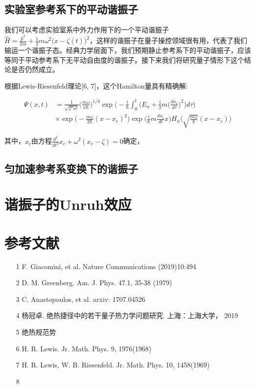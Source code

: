 \documentclass[a4paper]{article}
\begin{document}
    \subsection{实验室参考系下的平动谐振子}
        我们可以考虑实验室系中外力作用下的一个平动谐振子$\hat{H}=\frac{\hat{p}^2}{2m}+\frac{1}{2}m\omega^2\big(\hat{x}-\zeta(t)\big)^2$，这样的谐振子在量子操控领域很有用，代表了我们输运一个谐振子态。经典力学层面下，我们预期静止参考系下的平动谐振子，应该等同于平动参考系下无平动自由度的谐振子。接下来我们将研究量子情形下这个结论是否仍然成立。

        根据Lewis-Riesenfeld理论[6, 7]，这个Hamilton量具有精确解:

        \begin{equation}
            \begin{split}  
                \Psi(x,t)& =\frac{1}{\sqrt{2^n n!}}\bigg(\frac{m\omega}{\pi\hbar}\bigg)^{1/4} \exp\bigg(-\frac{i}{\hbar}\int_0^t \bigg(E_n+\frac{1}{2}m\big(\frac{dx_c}{d\tau}\big)^2\bigg)d\tau\bigg) \\
                    & \times\exp\bigg(-\frac{m\omega}{2\hbar}(x-x_c)^2\bigg) \exp\bigg(\frac{i}{\hbar}m\frac{dx_c}{dt}x\bigg) H_n\bigg(\sqrt{\frac{m\omega}{\hbar}}(x-x_c)\bigg)
            \end{split}
        \end{equation}
    
        其中，$x_c$由方程$\frac{d^2}{dt^2}x_c+\omega^2(x_c-\zeta)=0$确定，

    \subsection{匀加速参考系变换下的谐振子}

    \section{谐振子的Unruh效应}


    \section*{参考文献}
    \begin{itemize}
        \item[1] F. Giacomini, et al. Nature Communications (2019)10:494
        \item[2] D. M. Greenberg. Am. J. Phys. 47.1, 35-38 (1979)
        \item[3] C. Anastopoulos, et al. arxiv: 1707.04526
        \item[4] 杨冠卓. 绝热捷径中的若干量子热力学问题研究. 上海：上海大学， 2019
        \item[5] 绝热规范势
        \item[6] H. R. Lewis. Jr. Math. Phys. 9, 1976(1968) 
        \item[7] H. R. Lewis, W. B. Riesenfeld. Jr. Math. Phys. 10, 1458(1969)
        \item[8]  
    \end{itemize}
\end{document}
